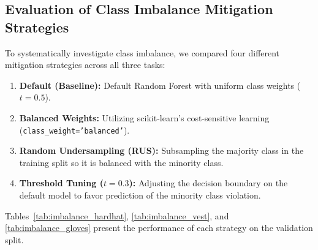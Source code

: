 \documentclass[11pt,a4paper]{article}
\begin{document}
\subsection{Evaluation of Class Imbalance Mitigation Strategies}
\label{sec:class_imbalance}
To systematically investigate class imbalance, we compared four different mitigation strategies across all three tasks:
\begin{enumerate}
  \item \textbf{Default (Baseline):} Default Random Forest with uniform class weights ($t=0.5$).
  \item \textbf{Balanced Weights:} Utilizing scikit-learn's cost-sensitive learning (\texttt{class\_weight='balanced'}).
  \item \textbf{Random Undersampling (RUS):} Subsampling the majority class in the training split so it is balanced with the minority class.
  \item \textbf{Threshold Tuning ($t=0.3$):} Adjusting the decision boundary on the default model to favor prediction of the minority class violation.
\end{enumerate}

Tables~\ref{tab:imbalance_hardhat}, \ref{tab:imbalance_vest}, and \ref{tab:imbalance_gloves} present the performance of each strategy on the validation split.

\begin{table}[h]
  \centering
  \caption{Evaluation of Class Imbalance Mitigation Strategies for Hardhat vs NO-Hardhat task}
  \label{tab:imbalance_hardhat}
\end{table}
\end{document}
